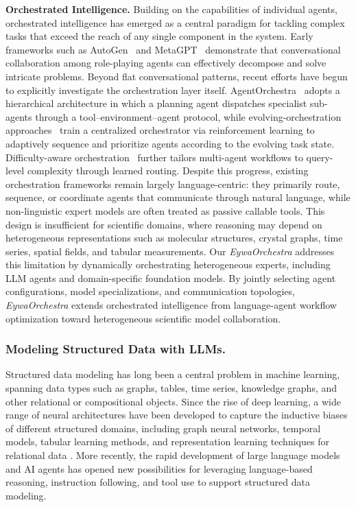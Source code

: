 \textbf{Orchestrated Intelligence.}
Building on the capabilities of individual agents, orchestrated intelligence has emerged as a central paradigm for tackling complex tasks that exceed the reach of any single component in the system. Early frameworks such as AutoGen~\cite{DBLP:journals/corr/abs-2308-08155} and MetaGPT~\cite{DBLP:conf/iclr/HongZCZCWZWYLZR24} demonstrate that conversational collaboration among role-playing agents can effectively decompose and solve intricate problems. Beyond flat conversational patterns, recent efforts have begun to explicitly investigate the orchestration layer itself. AgentOrchestra~\cite{zhang2025agentorchestra} adopts a hierarchical architecture in which a planning agent dispatches specialist sub-agents through a tool--environment--agent protocol, while evolving-orchestration approaches~\cite{DBLP:journals/corr/abs-2505-19591} train a centralized orchestrator via reinforcement learning to adaptively sequence and prioritize agents according to the evolving task state. Difficulty-aware orchestration~\cite{DBLP:journals/corr/abs-2509-11079} further tailors multi-agent workflows to query-level complexity through learned routing.
Despite this progress, existing orchestration frameworks remain largely language-centric: they primarily route, sequence, or coordinate agents that communicate through natural language, while non-linguistic expert models are often treated as passive callable tools. This design is insufficient for scientific domains, where reasoning may depend on heterogeneous representations such as molecular structures, crystal graphs, time series, spatial fields, and tabular measurements. Our \textit{EywaOrchestra} addresses this limitation by dynamically orchestrating heterogeneous experts, including LLM agents and domain-specific foundation models. By jointly selecting agent configurations, model specializations, and communication topologies, \textit{EywaOrchestra} extends orchestrated intelligence from language-agent workflow optimization toward heterogeneous scientific model collaboration.


\subsubsection{Modeling Structured Data with LLMs.}

Structured data modeling has long been a central problem in machine learning, spanning data types such as graphs, tables, time series, knowledge graphs, and other relational or compositional objects. Since the rise of deep learning, a wide range of neural architectures have been developed to capture the inductive biases of different structured domains, including graph neural networks, temporal models, tabular learning methods, and representation learning techniques for relational data \cite{wu2020comprehensive, lim2021time, borisov2022deep, antelmi2023survey, han2022data, fu2023investigating}. More recently, the rapid development of large language models and AI agents has opened new possibilities for leveraging language-based reasoning, instruction following, and tool use to support structured data modeling.

